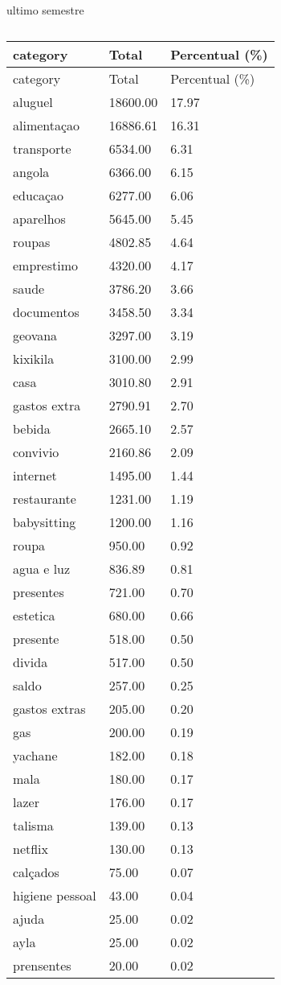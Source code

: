 \documentclass[
  8pt,
  a4paper,
  DIV=11,
  numbers=noendperiod]{scrartcl}
\begin{document}
\begin{figure}
\begin{minipage}{0.50\linewidth}
\end{minipage}%
%
\begin{minipage}{0.50\linewidth}
ultimo semestre

\begin{longtable}[]{@{}lll@{}}
\caption{}\label{T_cccd9}\tabularnewline
\toprule\noalign{}
category & Total & Percentual (\%) \\
\midrule\noalign{}
\endfirsthead
\toprule\noalign{}
category & Total & Percentual (\%) \\
\midrule\noalign{}
\endhead
\bottomrule\noalign{}
\endlastfoot
aluguel & 18600.00 & 17.97 \\
alimentaçao & 16886.61 & 16.31 \\
transporte & 6534.00 & 6.31 \\
angola & 6366.00 & 6.15 \\
educaçao & 6277.00 & 6.06 \\
aparelhos & 5645.00 & 5.45 \\
roupas & 4802.85 & 4.64 \\
emprestimo & 4320.00 & 4.17 \\
saude & 3786.20 & 3.66 \\
documentos & 3458.50 & 3.34 \\
geovana & 3297.00 & 3.19 \\
kixikila & 3100.00 & 2.99 \\
casa & 3010.80 & 2.91 \\
gastos extra & 2790.91 & 2.70 \\
bebida & 2665.10 & 2.57 \\
convivio & 2160.86 & 2.09 \\
internet & 1495.00 & 1.44 \\
restaurante & 1231.00 & 1.19 \\
babysitting & 1200.00 & 1.16 \\
roupa & 950.00 & 0.92 \\
agua e luz & 836.89 & 0.81 \\
presentes & 721.00 & 0.70 \\
estetica & 680.00 & 0.66 \\
presente & 518.00 & 0.50 \\
divida & 517.00 & 0.50 \\
saldo & 257.00 & 0.25 \\
gastos extras & 205.00 & 0.20 \\
gas & 200.00 & 0.19 \\
yachane & 182.00 & 0.18 \\
mala & 180.00 & 0.17 \\
lazer & 176.00 & 0.17 \\
talisma & 139.00 & 0.13 \\
netflix & 130.00 & 0.13 \\
calçados & 75.00 & 0.07 \\
higiene pessoal & 43.00 & 0.04 \\
ajuda & 25.00 & 0.02 \\
ayla & 25.00 & 0.02 \\
prensentes & 20.00 & 0.02 \\
\end{longtable}


\end{minipage}
\end{figure}
\end{document}
